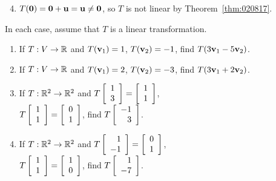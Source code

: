\begin{multicols}{2}
\begin{ex}
\begin{sol}
\begin{enumerate}[label={\alph*.}]
\setcounter{enumi}{3}
\item  $T(\textbf{0}) = \textbf{0} + \textbf{u} = \textbf{u} \neq \textbf{0}$, so $T$ is not linear by Theorem~\ref{thm:020817}.

\end{enumerate}
\end{sol}
\end{ex}

\begin{ex}
In each case, assume that $T$ is a linear transformation.


\begin{enumerate}[label={\alph*.}]
\item If $T : V \to \mathbb{R}$ and $T(\textbf{v}_{1}) = 1$, $T(\textbf{v}_{2}) = -1$, find $T(3\textbf{v}_{1} - 5\textbf{v}_{2})$.

\item If $T : V \to \mathbb{R}$ and $T(\textbf{v}_{1}) = 2$, $T(\textbf{v}_{2}) = -3$, find $T(3\textbf{v}_{1} + 2\textbf{v}_{2})$.

\item If $T : \mathbb{R}^2 \to \mathbb{R}^2$ and $T\left[ \begin{array}{r}
1 \\
3
\end{array} \right] = \left[ \begin{array}{r}
1 \\
1
\end{array} \right]$, \\ $T\left[ \begin{array}{r}
1 \\
1
\end{array} \right] = \left[ \begin{array}{r}
0 \\
1
\end{array} \right]$, find $T\left[ \begin{array}{r}
-1 \\
3
\end{array} \right]$.

\item If $T : \mathbb{R}^2 \to \mathbb{R}^2$ and $T\left[ \begin{array}{r}
1 \\
-1
\end{array} \right] = \left[ \begin{array}{r}
0 \\
1
\end{array} \right]$, \\ $T\left[ \begin{array}{r}
1 \\
1
\end{array} \right] = \left[ \begin{array}{r}
1 \\
0
\end{array} \right]$, find $T\left[ \begin{array}{r}
 1 \\
 -7
 \end{array} \right]$.


\end{enumerate}
\end{ex}
\end{multicols}
